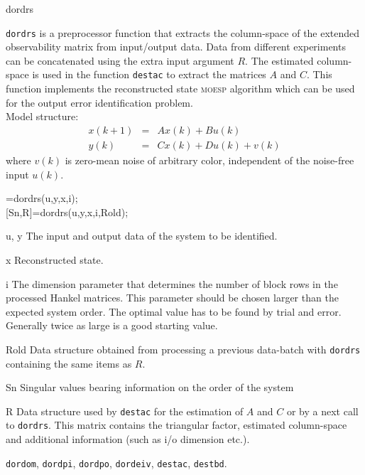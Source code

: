 \documentclass{book}
\newcommand{\moesp}{\textsc{moesp}}
\newcommand{\destbd}{\texttt{destbd}}
\newcommand{\dordom}{\texttt{dordom}}
\newcommand{\dordpo}{\texttt{dordpo}}
\newcommand{\dordpi}{\texttt{dordpi}}
\newcommand{\dordrs}{\texttt{dordrs}}
\newcommand{\dordeiv}{\texttt{dordeiv}}
\newcommand{\destac}{\texttt{destac}}
\begin{document}
\begin{command}{dordrs}
\begin{purpose} 
  {\dordrs} is a preprocessor function that extracts the column-space of
  the extended observability matrix from input/output data.  Data from
  different experiments can be concatenated using the extra input
  argument $R$. The estimated column-space is used in the function {\destac}
  to extract the matrices $A$ and $C$. This function implements the
  reconstructed state {\moesp} algorithm which can be used for the
  output error identification problem.\\
  Model structure:
  \begin{eqnarray*} 
    x(k+1) &=& Ax(k) + Bu(k) \\
    y(k)   &=& Cx(k) + Du(k) + v(k)
  \end{eqnarray*}
  where $v(k)$ is zero-mean noise of arbitrary color, independent
  of the noise-free input $u(k)$.
\end{purpose}

\begin{syntax}
[Sn,R]=dordrs(u,y,x,i);\\[0pt]
[Sn,R]=dordrs(u,y,x,i,Rold);
\end{syntax}

\begin{inputs}
\item[u, y] The input and output data of the system to be identified.
\item[x] Reconstructed state.
\item[i] The dimension parameter that determines the number of block
  rows in the processed Hankel matrices. This parameter should be
  chosen larger than the expected system order. The optimal value has
  to be found by trial and error. Generally twice as large is a good
  starting value.
\item[Rold] Data structure obtained from processing a previous
  data-batch with {\dordrs} containing the same items as $R$.
\end{inputs}
         
\begin{outputs}
\item[Sn] Singular values bearing information on the order of the
  system
\item[R] Data structure used by {\destac} for the estimation of $A$
  and $C$ or by a next call to {\dordrs}. This matrix contains the
  triangular factor, estimated column-space and additional information
  (such as i/o dimension etc.).
\end{outputs}
\begin{seealso}
\dordom, \dordpi, \dordpo, \dordeiv, \destac, \destbd.
\end{seealso}
\end{command}%
\end{document}
